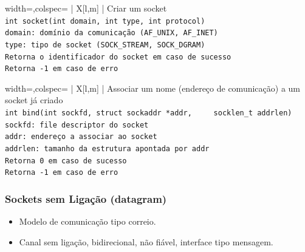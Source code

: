 \documentclass[11pt]{article}
\begin{document}
\begin{tblr}{width=\linewidth,colspec={ | X[l,m] | }}
    \hline
    \centering Criar um socket                                       \\\hline
    \lstinline|int socket(int domain, int type, int protocol)|       \\\hline
    \lstinline|domain: domínio da comunicação (AF_UNIX, AF_INET)|    \\
    \lstinline|type: tipo de socket (SOCK_STREAM, SOCK_DGRAM)|       \\\hline
    \lstinline|Retorna o identificador do socket em caso de sucesso| \\
    \lstinline|Retorna -1 em caso de erro|                           \\\hline
\end{tblr}

\begin{tblr}{width=\linewidth,colspec={ | X[l,m] | }}
    \hline
    \centering Associar um nome (endereço de comunicação) a um socket já criado \\\hline
    \lstinline|int bind(int sockfd, struct sockaddr *addr,
    socklen_t addrlen)|                                                         \\\hline
    \lstinline|sockfd: file descriptor do socket|                               \\
    \lstinline|addr: endereço a associar ao socket|                             \\
    \lstinline|addrlen: tamanho da estrutura apontada por addr|                 \\\hline
    \lstinline|Retorna 0 em caso de sucesso|                                    \\
    \lstinline|Retorna -1 em caso de erro|                                      \\\hline
\end{tblr}

\subsubsection*{Sockets sem Ligação (datagram)}

\begin{itemize}
    \item Modelo de comunicação tipo correio.
    \item Canal sem ligação, bidirecional, não fiável, interface tipo mensagem.
\end{itemize}
\end{document}
